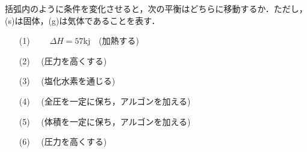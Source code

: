 \documentclass[a4paper,11pt]{ltjarticle}
\begin{document}
\ans
\newpage
\begin{que}
括弧内のように条件を変化させると，次の平衡はどちらに移動するか．ただし，(s)は固体，(g)は気体であることを表す．
\begin{itemize}
\item[(1)]~~~~$\varDelta H=57$kj~~(加熱する)
\item[(2)]~~(圧力を高くする)
\item[(3)]~~(塩化水素を通じる)
\item[(4)]~~(全圧を一定に保ち，アルゴンを加える)
\item[(5)]~~(体積を一定に保ち，アルゴンを加える)
\item[(6)]~~(圧力を高くする)
\end{itemize}
\end{que}
\ans
\newpage
\end{document}
